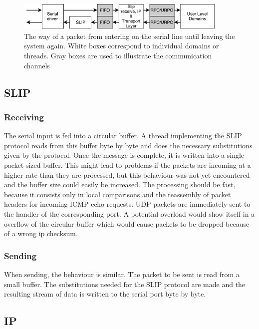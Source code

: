 \begin{figure}
\centering
	\includegraphics[width=0.9\textwidth]{Images/Packet_flow}
	\caption{The way of a packet from entering on the serial line until leaving the system again. White boxes correspond to individual domains or threads. Gray boxes are used to illustrate the communication channels \label{f:network_overview}}
\end{figure}

\subsection{SLIP}
\subsubsection{Receiving}
The serial input is fed into a circular buffer. A thread implementing the SLIP protocol reads from this buffer byte by byte and does the necessary substitutions given by the protocol. Once the message is complete, it is written into a single packet sized buffer. This might lead to problems if the packets are incoming at a higher rate than they are processed, but this behaviour was not yet encountered and the buffer size could easily be increased.
	The processing should be fast, because it consists only in local comparisons and the reassembly of packet headers for incoming ICMP echo requests. UDP packets are immediately sent to the handler of the corresponding port. A potential overload would show itself in a overflow of the circular buffer which would cause packets to be dropped because of a wrong ip checksum.
\subsubsection{Sending}
When sending, the behaviour is similar. The packet to be sent is read from a small buffer. The substitutions needed for the SLIP protocol are made and the resulting stream of data is written to the serial port byte by byte.
\subsection{IP}
